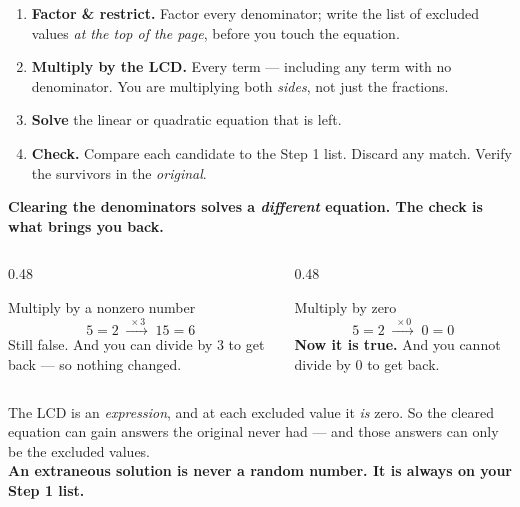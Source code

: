 \documentclass[aspectratio=169, 11pt]{beamer}
\begin{document}
\begin{frame}[t, plain]
  \begin{enumerate}\setlength{\itemsep}{6pt}
    \item \textbf{Factor \& restrict.} Factor every denominator; write the list of excluded values
          \emph{at the top of the page}, before you touch the equation.
    \item \textbf{Multiply by the LCD.} Every term --- including any term with no denominator. You are
          multiplying both \emph{sides}, not just the fractions.
    \item \textbf{Solve} the linear or quadratic equation that is left.
    \item \textbf{Check.} Compare each candidate to the Step 1 list. Discard any match. Verify the
          survivors in the \emph{original}.
  \end{enumerate}
  \vspace{6pt}
  \begin{block}{}
    \centering\textbf{Clearing the denominators solves a \emph{different} equation.
    The check is what brings you back.}
  \end{block}
\end{frame}

\begin{frame}[t, plain]
  \begin{columns}[T]
    \begin{column}{0.48\textwidth}
      \begin{block}{Multiply by a nonzero number}
        \[ 5=2 \;\xrightarrow{\;\times 3\;}\; 15=6 \]
        Still false. And you can divide by $3$ to get back --- so nothing changed.
      \end{block}
    \end{column}
    \begin{column}{0.48\textwidth}
      \begin{block}{Multiply by zero}
        \[ 5=2 \;\xrightarrow{\;\times 0\;}\; 0=0 \]
        \textbf{Now it is true.} And you cannot divide by $0$ to get back.
      \end{block}
    \end{column}
  \end{columns}
  \vspace{8pt}
  \begin{block}{}
    The LCD is an \emph{expression}, and at each excluded value it \emph{is} zero. So the cleared
    equation can gain answers the original never had --- and those answers can only be the excluded
    values. \\[3pt]
    \centering\textbf{An extraneous solution is never a random number. It is always on your Step 1
    list.}
  \end{block}
\end{frame}
\end{document}
